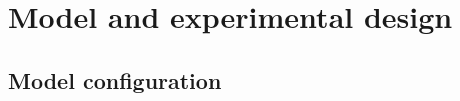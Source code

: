 \documentclass[11pt,a4paper]{article}
\newcommand\todo[1]{\textbf{TODO: #1}}
\begin{document}


\newpage
\section{Model and experimental design}

\subsection{Model configuration}

\end{document}
